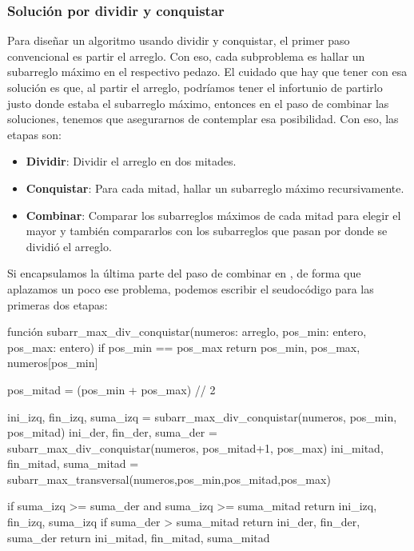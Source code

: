 \subsubsection{Solución por dividir y conquistar}
Para diseñar un algoritmo usando dividir y conquistar, el primer paso convencional es partir el arreglo. Con eso, cada subproblema es hallar un subarreglo máximo en el respectivo pedazo. El cuidado que hay que tener con esa solución es que, al partir el arreglo, podríamos tener el infortunio de partirlo justo donde estaba el subarreglo máximo, entonces en el paso de combinar las soluciones, tenemos que asegurarnos de contemplar esa posibilidad. Con eso, las etapas son:
\begin{itemize}
    \item \textbf{Dividir}: Dividir el arreglo en dos mitades.
    \item \textbf{Conquistar}: Para cada mitad, hallar un subarreglo máximo recursivamente.
    \item \textbf{Combinar}: Comparar los subarreglos máximos de cada mitad para elegir el mayor y también compararlos con los subarreglos que pasan por donde se dividió el arreglo.
\end{itemize}

Si encapsulamos la última parte del paso de combinar en , de forma que aplazamos un poco ese problema, podemos escribir el seudocódigo para las primeras dos etapas:
\begin{pseudocode}
función subarr_max_div_conquistar(numeros: arreglo, pos_min: entero, pos_max: entero)
    if pos_min == pos_max
        return pos_min, pos_max, numeros[pos_min]

    pos_mitad = (pos_min + pos_max) // 2

    ini_izq, fin_izq, suma_izq = subarr_max_div_conquistar(numeros, pos_min, pos_mitad)
    ini_der, fin_der, suma_der = subarr_max_div_conquistar(numeros, pos_mitad+1, pos_max)
    ini_mitad, fin_mitad, suma_mitad = subarr_max_transversal(numeros,pos_min,pos_mitad,pos_max)

    if suma_izq >= suma_der and suma_izq >= suma_mitad
        return ini_izq, fin_izq, suma_izq
    if suma_der > suma_mitad
        return ini_der, fin_der, suma_der
    return ini_mitad, fin_mitad, suma_mitad
\end{pseudocode}

